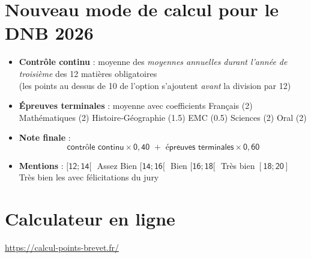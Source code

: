 \documentclass[11pt,a5paper]{article}
\begin{document}
\vspace*{2em}
\section*{Nouveau mode de calcul pour le DNB 2026}
\vspace{1em}
\begin{itemize}[leftmargin=1.1em,itemsep=1.2em]
\item \textbf{Contrôle continu} : moyenne des \emph{moyennes annuelles durant l’année de troisième} des 12 matières obligatoires\\
\vspace{0.2em}
(les points au dessus de 10 de l'option s’ajoutent \emph{avant} la division par 12)
\item \textbf{Épreuves terminales} : moyenne avec coefficients 
\subitem Français (2)
\subitem Mathématiques (2)
\subitem Histoire‑Géographie (1.5)
\subitem EMC (0.5)
\subitem Sciences (2)
\subitem Oral (2)
\item \textbf{Note finale} :
\vspace{-0.4em}
\[ \mathsf{\textsf{contrôle continu} \times 0,40 \,\, + \,\, \textsf{épreuves terminales} \times 0,60} \]
\item \textbf{Mentions} :
\subitem $\mathsf{[12;14[}\,\,$ Assez Bien
\subitem $\mathsf{[14; 16[}\,\,$ Bien
\subitem $\mathsf{[16; 18[}\,\,$ Très bien
\subitem $\mathsf{[18; 20]}\,\,$ Très bien les avec félicitations du jury
\end{itemize}

\section*{Calculateur en ligne}
\url{https://calcul-points-brevet.fr/}
\newpage
\end{document}
